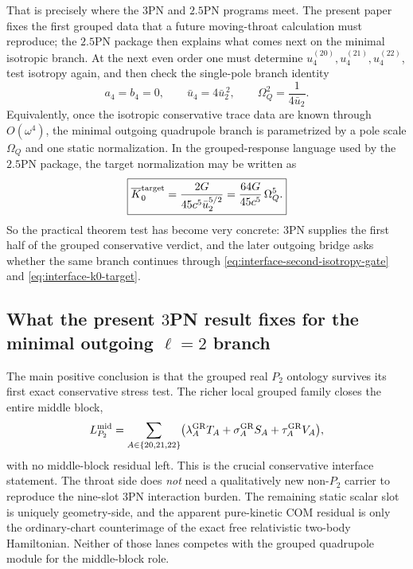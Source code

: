 \documentclass[11pt]{article}
\begin{document}
That is precisely where the $3$PN and $2.5$PN programs meet.  The present paper
fixes the first grouped data that a future moving-throat calculation must
reproduce; the $2.5$PN package then explains what comes next on the minimal
isotropic branch.  At the next even order one must determine
\(u_4^{(20)},u_4^{(21)},u_4^{(22)}\), test isotropy again, and then check the
single-pole branch identity
\begin{equation}
\boxed{
 a_4=b_4=0,
\qquad
 \bar u_4=4\bar u_2^{\,2},
\qquad
 \Omega_Q^2=\frac{1}{4\bar u_2}.
}
\label{eq:interface-second-isotropy-gate}
\end{equation}
Equivalently, once the isotropic conservative trace data are known through
$O(\omega^4)$, the minimal outgoing quadrupole branch is parametrized by a pole
scale \(\Omega_Q\) and one static normalization.  In the grouped-response
language used by the $2.5$PN package, the target normalization may be written as
\begin{equation}
\boxed{
\overline K_0^{\rm target}
=
\frac{2G}{45c^5\bar u_2^{5/2}}
=
\frac{64G}{45c^5}\,\Omega_Q^5.
}
\label{eq:interface-k0-target}
\end{equation}
So the practical theorem test has become very concrete: $3$PN supplies the first
half of the grouped conservative verdict, and the later outgoing bridge asks
whether the same branch continues through
\eqref{eq:interface-second-isotropy-gate} and
\eqref{eq:interface-k0-target}.

\subsection{What the present \texorpdfstring{$3$}{3}PN result fixes for the minimal outgoing \texorpdfstring{$\ell=2$}{ell=2} branch}
\label{sec:interface-fixes}

The main positive conclusion is that the grouped real $P_2$ ontology survives
its first exact conservative stress test.  The richer local grouped family
closes the entire middle block,
\begin{equation}
L_{P_2}^{\rm mid}
=
\sum_{A\in\{20,21,22\}}
\bigl(
\lambda_A^{\rm GR}T_A+\sigma_A^{\rm GR}S_A+\tau_A^{\rm GR}V_A
\bigr),
\label{eq:interface-grouped-module}
\end{equation}
with no middle-block residual left.  This is the crucial conservative interface
statement.  The throat side does \emph{not} need a qualitatively new non-$P_2$
carrier to reproduce the nine-slot $3$PN interaction burden.  The remaining
static scalar slot is uniquely geometry-side, and the apparent pure-kinetic COM
residual is only the ordinary-chart counterimage of the exact free relativistic
two-body Hamiltonian.  Neither of those lanes competes with the grouped
quadrupole module for the middle-block role.
\end{document}
